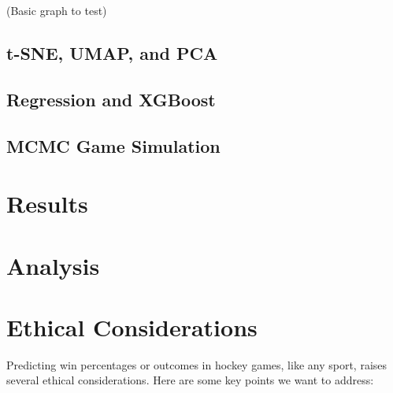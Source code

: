 \documentclass[11pt]{article}
\begin{document}
(Basic graph to test)

\begin{center}
\end{center}

\subsection{t-SNE, UMAP, and PCA}

\subsection{Regression and XGBoost}

\subsection{MCMC Game Simulation}

\section{Results}

\section{Analysis}

\section{Ethical Considerations}
Predicting win percentages or outcomes in hockey games, like any sport, raises several ethical considerations. Here are some key points we want to address:
\end{document}
